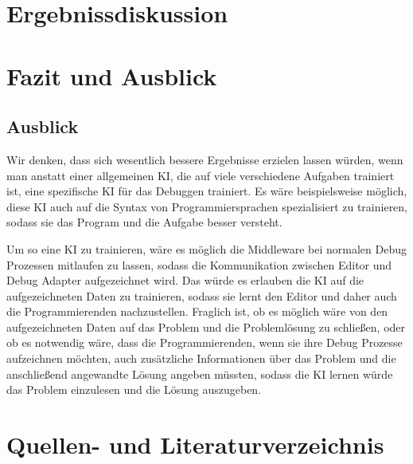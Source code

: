\documentclass[a4paper,12pt,ngerman]{scrartcl}
\begin{document}
\section{Ergebnissdiskussion}

\section{Fazit und Ausblick}

\subsection{Ausblick}

Wir denken, dass sich wesentlich bessere Ergebnisse erzielen lassen würden, wenn man anstatt einer allgemeinen KI, die auf viele verschiedene Aufgaben trainiert ist, eine spezifische KI für das Debuggen trainiert. Es wäre beispielsweise möglich, diese KI auch auf die Syntax von Programmiersprachen spezialisiert zu trainieren, sodass sie das Program und die Aufgabe besser versteht.

Um so eine KI zu trainieren, wäre es möglich die Middleware bei normalen Debug Prozessen mitlaufen zu lassen, sodass die Kommunikation zwischen Editor und Debug Adapter aufgezeichnet wird. Das würde es erlauben die KI auf die aufgezeichneten Daten zu trainieren, sodass sie lernt den Editor und daher auch die Programmierenden nachzustellen. Fraglich ist, ob es möglich wäre von den aufgezeichneten Daten auf das Problem und die Problemlösung zu schließen, oder ob es notwendig wäre, dass die Programmierenden, wenn sie ihre Debug Prozesse aufzeichnen möchten, auch zusätzliche Informationen über das Problem und die anschließend angewandte Lösung angeben müssten, sodass die KI lernen würde das Problem einzulesen und die Lösung auszugeben.

\section{Quellen- und Literaturverzeichnis}
\end{document}

